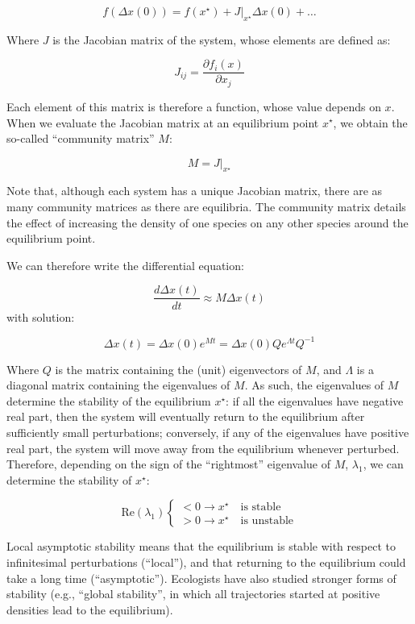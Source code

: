 \documentclass[
]{book}
\begin{document}
\[
f(\Delta x(0)) = f(x^\star)+ \left. J \right|_{x^\star} \Delta x(0) + \ldots
\]

Where \(J\) is the Jacobian matrix of the system, whose elements are defined as:

\[
J_{ij} = \frac{\partial f_i({x})}{\partial x_j} 
\]

Each element of this matrix is therefore a function, whose value depends on \({x}\). When we evaluate the Jacobian matrix at an equilibrium point \({x}^\star\), we obtain the so-called ``community matrix'' \({M}\):

\[
  M = \left. {J} \right|_{ {x}^\star}
\]

Note that, although each system has a unique Jacobian matrix, there are as many community matrices as there are equilibria. The community matrix details the effect of increasing the density of one species on any other species around the equilibrium point.

We can therefore write the differential equation:

\[
\frac{d \Delta x(t)}{dt} \approx M \Delta x(t)
\]
with solution:

\[
\Delta x(t) = \Delta x(0) e^{Mt} = \Delta x(0) Q e^{\Lambda t} Q^{-1}
\]

Where \(Q\) is the matrix containing the (unit) eigenvectors of \(M\), and \(\Lambda\) is a diagonal matrix containing the eigenvalues of \(M\). As such, the eigenvalues of \(M\) determine the stability of the equilibrium \({x}^\star\): if all the eigenvalues have negative real part, then the system will eventually return to the equilibrium after sufficiently small perturbations; conversely, if any of the eigenvalues have positive real part, the system will move away from the equilibrium whenever perturbed. Therefore, depending on the sign of the ``rightmost'' eigenvalue of \({M}\), \(\lambda_1\), we can determine the stability of \({x}^\star\):

\[
  \text{Re}(\lambda_1) \begin{cases}
    < 0 \to {x}^\star \quad \text{is stable}\\
    > 0 \to {x}^\star \quad \text{is unstable}
  \end{cases}
\]

Local asymptotic stability means that the equilibrium is stable with respect to infinitesimal perturbations (``local''), and that returning to the equilibrium could take a long time (``asymptotic''). Ecologists have also studied stronger forms of stability (e.g., ``global stability'', in which all trajectories started at positive densities lead to the equilibrium).
\end{document}
